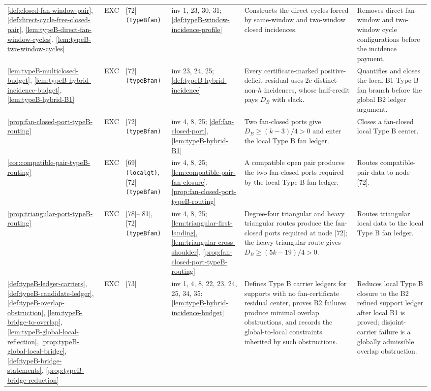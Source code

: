 \documentclass[11pt]{article}
\begin{document}
{\begin{longtable}{L{0.10\textwidth} C{0.045\textwidth} L{0.13\textwidth} L{0.135\textwidth} L{0.28\textwidth} L{0.20\textwidth}}
\cref{def:closed-fan-window-pair}, \cref{def:direct-cycle-free-closed-pair}, \cref{lem:typeB-direct-fan-window-cycles}, \cref{lem:typeB-two-window-cycles} & EXC & [72] \texttt{(typeBfan)} & inv 1, 23, 30, 31; \cref{def:typeB-window-incidence-profile} & Constructs the direct cycles forced by same-window and two-window closed incidences. & Removes direct fan-window and two-window cycle configurations before the incidence payment. \\
\cref{lem:typeB-multiclosed-budget}, \cref{lem:typeB-hybrid-incidence-budget}, \cref{lem:typeB-hybrid-B1} & EXC & [72] \texttt{(typeBfan)} & inv 23, 24, 25; \cref{def:typeB-hybrid-incidence} & Every certificate-marked positive-deficit residual uses \(2c\) distinct non-\(h\) incidences, whose half-credit pays \(D_B\) with slack. & Quantifies and closes the local B1 Type B fan branch before the global B2 ledger argument. \\
\cref{prop:fan-closed-port-typeB-routing} & EXC & [72] \texttt{(typeBfan)} & inv 4, 8, 25; \cref{def:fan-closed-port}, \cref{lem:typeB-hybrid-B1} & Two fan-closed ports give \(D_B\ge(k-3)/4>0\) and enter the local Type B fan ledger. & Closes a fan-closed local Type B center. \\
\cref{cor:compatible-pair-typeB-routing} & EXC & [69] \texttt{(localgt)}, [72] \texttt{(typeBfan)} & inv 4, 8, 25; \cref{lem:compatible-pair-fan-closure}, \cref{prop:fan-closed-port-typeB-routing} & A compatible open pair produces the two fan-closed ports required by the local Type B fan ledger. & Routes compatible-pair data to node [72]. \\
\cref{prop:triangular-port-typeB-routing} & EXC & [78]--[81], [72] \texttt{(typeBfan)} & inv 4, 8, 25; \cref{lem:triangular-first-landing}, \cref{lem:triangular-cross-shoulder}, \cref{prop:fan-closed-port-typeB-routing} & Degree-four triangular and heavy triangular routes produce the fan-closed ports required at node [72]; the heavy triangular route gives \(D_B\ge(5k-19)/4>0\). & Routes triangular local data to the local Type B fan ledger. \\
\cref{def:typeB-ledger-carriers}, \cref{def:typeB-candidate-ledger}, \cref{def:typeB-overlap-obstruction}, \cref{lem:typeB-bridge-to-overlap}, \cref{lem:typeB-global-local-reflection}, \cref{prop:typeB-global-local-bridge}, \cref{def:typeB-bridge-statements}, \cref{prop:typeB-bridge-reduction} & EXC & [73] & inv 1, 4, 8, 22, 23, 24, 25, 34, 35; \cref{lem:typeB-hybrid-incidence-budget} & Defines Type B carrier ledgers for supports with no fan-certificate residual center, proves B2 failures produce minimal overlap obstructions, and records the global-to-local constraints inherited by such obstructions. & Reduces local Type B closure to the B2 refined support ledger after local B1 is proved; disjoint-carrier failure is a globally admissible overlap obstruction. \\

\end{longtable}}
\end{document}
